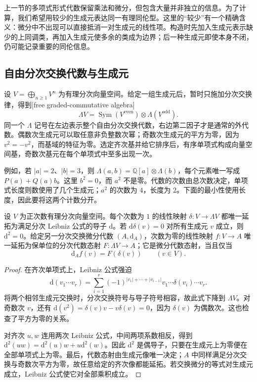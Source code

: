 上一节的多项式形式代数保留乘法和微分，但包含大量并非独立的信息。为了计算，我们希望用较少的生成元表达同一有理同伦型。这里的“较少”有一个精确含义：微分中不出现可以直接抵消一对生成元的线性项。构造时先加入生成元表示缺少的上同调类，再加入生成元使多余的类成为边界；后一种生成元即使本身不闭，仍可能记录重要的同伦信息。

\subsection{自由分次交换代数与生成元}
\label{g2:subsec:E02:01}

设 \(V=\bigoplus_{n\ge1}V^n\) 为有理分次向量空间。给定一组生成元后，暂时只施加分次交换律，得到[free graded-commutative algebra]
\[
	\Lambda V=\operatorname{Sym}(V^{\mathrm{even}})\otimes\Lambda(V^{\mathrm{odd}}).
\]
同一个 \(\Lambda\) 记号在左边表示整个自由分次交换代数，右边第二因子才是通常的外代数。偶数次生成元可以取任意非负整数次幂；奇数次生成元的平方为零，因为 \(v^2=-v^2\)，而基域的特征为零。选定齐次基并给它排序后，有序单项式构成向量空间基，奇数次基元在每个单项式中至多出现一次。

\ProseParagraphBreak

例如，若 \(|a|=2\)、\(|b|=3\)，则 \(\Lambda(a,b)=\mathbb Q[a]\otimes\Lambda(b)\)，每个元素唯一写成 \(P(a)+Q(a)b\)。这里 \(b^2=0\)，而 \(a^2\) 不是零。代数的次数由总次数决定，单项式长度则数使用了几个生成元；\(a^2\) 的次数为 \(4\)，长度为 \(2\)。下面的最小性使用长度，因此要将这两个计数分开。

\begin{proposition}\label{g2:prop:free-cdga-extension}
	设 \(V\) 为正次数有理分次向量空间。每个次数为 \(1\) 的线性映射 \(\delta:V\to\Lambda V\) 都唯一延拓为满足分次 Leibniz 公式的导子 \(\mathrm d\)。若 \(\mathrm d\delta(v)=0\) 对所有生成元 \(v\) 成立，则 \(\mathrm d^2=0\)。给定另一分次交换微分代数 \((A,\mathrm d_A)\)，次数为零的线性映射 \(f:V\to A\) 唯一延拓为保单位的分次代数态射 \(F:\Lambda V\to A\)；它是微分代数态射，当且仅当
	\[
		\mathrm d_Af(v)=F(\delta(v))\qquad(v\in V).
	\]
\end{proposition}
\begin{proof}
	在齐次单项式上，Leibniz 公式强迫
	\[
		\mathrm d(v_1\cdots v_r)=\sum_{i=1}^r(-1)^{|v_1|+\cdots+|v_{i-1}|}v_1\cdots\delta(v_i)\cdots v_r.
	\]
	将两个相邻生成元交换时，分次交换符号与导子符号相容，故此式下降到 \(\Lambda V\)。对奇数次 \(v\)，还有 \(\mathrm d(v^2)=\delta(v)v-v\delta(v)=0\)，因为 \(\delta(v)\) 为偶数次。这也检查了平方为零的关系。

	对齐次 \(u,w\) 连用两次 Leibniz 公式，中间两项系数相反，得到 \(\mathrm d^2(uw)=\mathrm d^2(u)w+u\mathrm d^2(w)\)。因此 \(\mathrm d^2\) 是偶导子，只要在生成元上为零便在全部单项式上为零。最后，代数态射由生成元像唯一决定；\(A\) 中同样满足分次交换与奇数次平方为零，故任意给定的齐次像都能延拓。若交换微分的等式对生成元成立，Leibniz 公式使它对全部乘积成立。
\end{proof}

